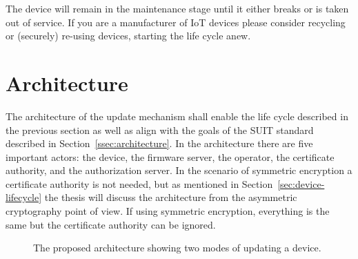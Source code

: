 \documentclass[0-thesis.tex]{subfiles}
\begin{document}
The device will remain in the maintenance stage until it either breaks or is taken out of
service. If you are a manufacturer of IoT devices please consider recycling or (securely)
re-using devices, starting the life cycle anew.

\section{Architecture}
\label{sec:architecture}
The architecture of the update mechanism shall enable the life cycle described in the
previous section as well as align with the goals of the SUIT standard described in
Section~\ref{ssec:architecture}. In the architecture there are five important actors: the
device, the firmware server, the operator, the certificate authority, and the
authorization server. In the scenario of symmetric encryption a certificate authority is
not needed, but as mentioned in Section~\ref{sec:device-lifecycle} the thesis will discuss
the architecture from the asymmetric cryptography point of view. If using symmetric
encryption, everything is the same but the certificate authority can be ignored.

\begin{figure}
    \caption{The proposed architecture showing two modes of updating a device.}
    \label{fig:architecture}
\end{figure}
\end{document}

